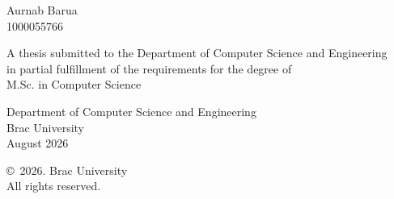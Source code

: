 \begin{titlepage}
\renewcommand*{\thepage}{Title} %

    \begin{center} 
        \vspace*{3cm} %
        
        {\fontsize{16pt}{22pt}\selectfont{Explainable Deep Learning-Based Skin Condition Classification and Severity Estimation Using Transfer Learning and Grad-CAM Visualization}
        } %
        
        \vspace{1.5cm}
        
        
        \vspace{0.5cm}
        
        	Aurnab Barua\\
	        1000055766\\
	       

        \vspace{1.5cm}
        
        	A thesis submitted to the Department of Computer Science and Engineering\\
            in partial fulfillment of the requirements for the degree of\\
            M.Sc. in Computer Science

        
        \vspace{2.5cm}
        
    		Department of Computer Science and Engineering\\
            Brac University\\
            August 2026
        
        \vspace{3cm}
        
    		\copyright\ 2026. Brac University\\
            All rights reserved.
    
    \end{center}

\end{titlepage}